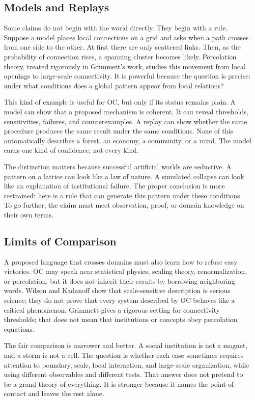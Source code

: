 \documentclass[11pt,a4paper,openany]{book}
\begin{document}
\subsection{Models and Replays}
Some claims do not begin with the world directly. They begin with a rule. Suppose a model places local connections on a grid and asks when a path crosses from one side to the other. At first there are only scattered links. Then, as the probability of connection rises, a spanning cluster becomes likely. Percolation theory, treated rigorously in Grimmett's work, studies this movement from local openings to large-scale connectivity. It is powerful because the question is precise: under what conditions does a global pattern appear from local relations? \cite{grimmett_percolation,goldenfeld_lectures}\par
This kind of example is useful for OC, but only if its status remains plain. A model can show that a proposed mechanism is coherent. It can reveal thresholds, sensitivities, failures, and counterexamples. A replay can show whether the same procedure produces the same result under the same conditions. None of this automatically describes a forest, an economy, a community, or a mind. The model earns one kind of confidence, not every kind.\par
The distinction matters because successful artificial worlds are seductive. A pattern on a lattice can look like a law of nature. A simulated collapse can look like an explanation of institutional failure. The proper conclusion is more restrained: here is a rule that can generate this pattern under these conditions. To go further, the claim must meet observation, proof, or domain knowledge on their own terms.\par
\subsection{Limits of Comparison}
A proposed language that crosses domains must also learn how to refuse easy victories. OC may speak near statistical physics, scaling theory, renormalization, or percolation, but it does not inherit their results by borrowing neighboring words. Wilson and Kadanoff show that scale-sensitive description is serious science; they do not prove that every system described by OC behaves like a critical phenomenon. Grimmett gives a rigorous setting for connectivity thresholds; that does not mean that institutions or concepts obey percolation equations. \cite{grimmett_percolation,goldenfeld_lectures}\par
The fair comparison is narrower and better. A social institution is not a magnet, and a storm is not a cell. The question is whether each case sometimes requires attention to boundary, scale, local interaction, and large-scale organization, while using different observables and different tests. That answer does not pretend to be a grand theory of everything. It is stronger because it names the point of contact and leaves the rest alone.\par
\end{document}
